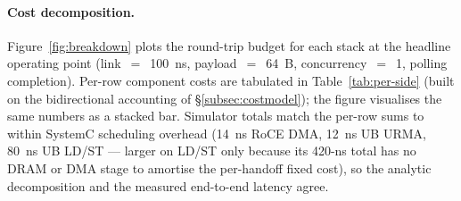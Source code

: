 \documentclass[10pt,twocolumn]{article}
\begin{document}
\paragraph{Cost decomposition.}
\label{subsec:breakdown}
Figure~\ref{fig:breakdown} plots the round-trip budget for each
stack at the headline operating point (link~$=$~100~ns,
payload~$=$~64~B, concurrency~$=$~1, polling completion). Per-row
component costs are tabulated in Table~\ref{tab:per-side} (built on
the bidirectional accounting of \S\ref{subsec:costmodel}); the
figure visualises the same numbers as a stacked bar. Simulator
totals match the per-row sums to within SystemC scheduling overhead
(14~ns RoCE DMA, 12~ns UB URMA, 80~ns UB LD/ST --- larger on LD/ST
only because its 420-ns total has no DRAM or DMA stage to amortise
the per-handoff fixed cost), so the analytic decomposition and the
measured end-to-end latency agree.
\end{document}
